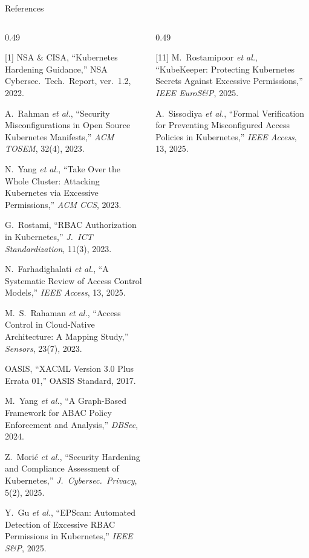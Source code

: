 \documentclass[aspectratio=169,10pt]{beamer}
\begin{document}
\begin{frame}[t]{References}
\vspace{2pt}
\begin{columns}[T,onlytextwidth]
\begin{column}{0.49\textwidth}
{\tiny\setlength{\parindent}{0pt}\setlength{\parskip}{2.2pt}%
%
[1] NSA \& CISA, ``Kubernetes Hardening Guidance,'' NSA Cybersec.\ Tech.\ Report, ver.\ 1.2, 2022.\par
[2] A.\ Rahman \emph{et al.}, ``Security Misconfigurations in Open Source Kubernetes Manifests,'' \emph{ACM TOSEM}, 32(4), 2023.\par
[3] N.\ Yang \emph{et al.}, ``Take Over the Whole Cluster: Attacking Kubernetes via Excessive Permissions,'' \emph{ACM CCS}, 2023.\par
[4] G.\ Rostami, ``RBAC Authorization in Kubernetes,'' \emph{J.\ ICT Standardization}, 11(3), 2023.\par
[5] N.\ Farhadighalati \emph{et al.}, ``A Systematic Review of Access Control Models,'' \emph{IEEE Access}, 13, 2025.\par
[6] M.\ S.\ Rahaman \emph{et al.}, ``Access Control in Cloud-Native Architecture: A Mapping Study,'' \emph{Sensors}, 23(7), 2023.\par
[7] OASIS, ``XACML Version 3.0 Plus Errata 01,'' OASIS Standard, 2017.\par
[8] M.\ Yang \emph{et al.}, ``A Graph-Based Framework for ABAC Policy Enforcement and Analysis,'' \emph{DBSec}, 2024.\par
[9] Z.\ Mori\'c \emph{et al.}, ``Security Hardening and Compliance Assessment of Kubernetes,'' \emph{J.\ Cybersec.\ Privacy}, 5(2), 2025.\par
[10] Y.\ Gu \emph{et al.}, ``EPScan: Automated Detection of Excessive RBAC Permissions in Kubernetes,'' \emph{IEEE S\&P}, 2025.\par
}
\end{column}
\begin{column}{0.49\textwidth}
{\tiny\setlength{\parindent}{0pt}\setlength{\parskip}{2.0pt}%
%
[11] M.\ Rostamipoor \emph{et al.}, ``KubeKeeper: Protecting Kubernetes Secrets Against Excessive Permissions,'' \emph{IEEE EuroS\&P}, 2025.\par
[12] A.\ Sissodiya \emph{et al.}, ``Formal Verification for Preventing Misconfigured Access Policies in Kubernetes,'' \emph{IEEE Access}, 13, 2025.\par
}
\end{column}
\end{columns}
\end{frame}
\end{document}
